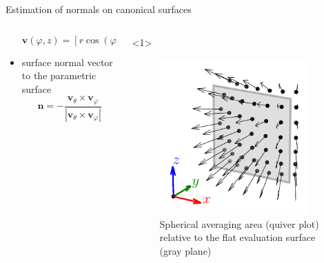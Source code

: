 \documentclass[xcolor=dvipsnames,10pt]{beamer}
\begin{document}
\begin{frame}{Estimation of normals on canonical surfaces}
\begin{columns}[c]
\begin{column}{0.7\textwidth}
\begin{itemize}
\begin{onlyenv}
                \begin{equation*}
                    \mathbf{v} \left(\varphi, z \right) = \left[ r \cos(\varphi), r \sin(\varphi), z \right]
                \end{equation*}
                \end{onlyenv}
                \item surface normal vector to the parametric surface
                \begin{equation*}
                {\mathbf{n}} = - \frac{\mathbf{v}_\theta \times \mathbf{v}_\varphi}{\left| \mathbf{v}_\theta \times \mathbf{v}_\varphi \right|}
                \end{equation*}
            \end{itemize}
        \end{column}
        \begin{column}{0.3\textwidth}
            \begin{onlyenv}<1>
            \begin{center}
                \begin{figure}
                    \includegraphics[width=0.9\textwidth]{artwork/eval_spherical.pdf}
                    \caption{Spherical averaging area (quiver plot) relative to the flat evaluation surface (gray plane)}
                \end{figure}
            \end{center}

\end{onlyenv}
\end{column}
\end{columns}
\end{frame}
\end{document}
